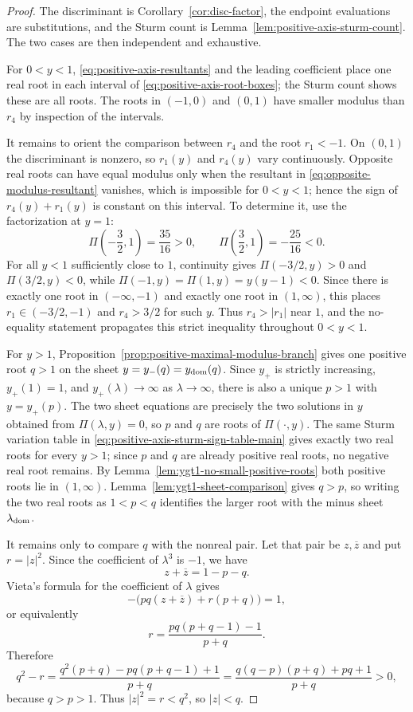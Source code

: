 \begin{proof}
 The discriminant is Corollary~\ref{cor:disc-factor}, the endpoint evaluations are substitutions, and the Sturm count is Lemma~\ref{lem:positive-axis-sturm-count}.  The two cases are then independent and exhaustive.

For $0<y<1$, \eqref{eq:positive-axis-resultants} and the leading coefficient place one real root in each interval of \eqref{eq:positive-axis-root-boxes}; the Sturm count shows these are all roots.  The roots in $(-1,0)$ and $(0,1)$ have smaller modulus than $r_4$ by inspection of the intervals.

It remains to orient the comparison between $r_4$ and the root $r_1<-1$.  On $(0,1)$ the discriminant is nonzero, so $r_1(y)$ and $r_4(y)$ vary continuously.  Opposite real roots can have equal modulus only when the resultant in \eqref{eq:opposite-modulus-resultant} vanishes, which is impossible for $0<y<1$; hence the sign of $r_4(y)+r_1(y)$ is constant on this interval.  To determine it, use the factorization at $y=1$:
\[
\Pi\!\left(-\frac32,1\right)=\frac{35}{16}>0,
\qquad
\Pi\!\left(\frac32,1\right)=-\frac{25}{16}<0.
\]
For all $y<1$ sufficiently close to $1$, continuity gives $\Pi(-3/2,y)>0$ and $\Pi(3/2,y)<0$, while $\Pi(-1,y)=\Pi(1,y)=y(y-1)<0$.  Since there is exactly one root in $(-\infty,-1)$ and exactly one root in $(1,\infty)$, this places $r_1\in(-3/2,-1)$ and $r_4>3/2$ for such $y$.  Thus $r_4>|r_1|$ near $1$, and the no-equality statement propagates this strict inequality throughout $0<y<1$.

For $y>1$, Proposition~\ref{prop:positive-maximal-modulus-branch} gives one positive root
$q>1$ on the sheet $y=y_-(q)=y_{\rm dom}(q)$.  Since $y_+$ is strictly increasing,
$y_+(1)=1$, and $y_+(\lambda)\to\infty$ as $\lambda\to\infty$, there is also a unique
$p>1$ with $y=y_+(p)$.  The two sheet equations are precisely the two solutions in $y$
obtained from $\Pi(\lambda,y)=0$, so $p$ and $q$ are roots of $\Pi(\cdot,y)$.  The same Sturm
variation table in \eqref{eq:positive-axis-sturm-sign-table-main} gives exactly two real
roots for every $y>1$; since $p$ and $q$ are already positive real roots, no negative real root remains.
By Lemma~\ref{lem:ygt1-no-small-positive-roots} both positive
roots lie in $(1,\infty)$.  Lemma~\ref{lem:ygt1-sheet-comparison} gives $q>p$, so writing
the two real roots as $1<p<q$ identifies the larger root with the minus sheet
$\lambda_{\rm dom}$.

It remains only to compare $q$ with the nonreal pair.  Let that pair be $z,\overline z$ and put $r=|z|^2$.  Since the coefficient of $\lambda^3$ is $-1$, we have
\[
z+\overline z=1-p-q.
\]
Vieta's formula for the coefficient of $\lambda$ gives
\[
-\bigl(pq(z+\overline z)+r(p+q)\bigr)=1,
\]
or equivalently
\[
r=\frac{pq(p+q-1)-1}{p+q}.
\]
Therefore
\[
q^2-r=
\frac{q^2(p+q)-pq(p+q-1)+1}{p+q}
=\frac{q(q-p)(p+q)+pq+1}{p+q}>0,
\]
because $q>p>1$.  Thus $|z|^2=r<q^2$, so $|z|<q$.
\end{proof}

